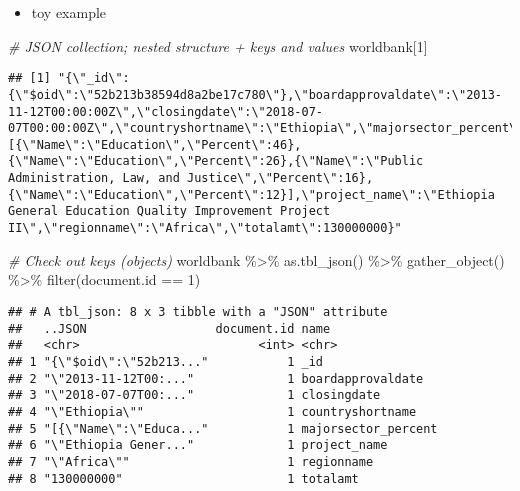 \documentclass[
]{book}
\newenvironment{Shaded}{\begin{snugshade}}{\end{snugshade}}
\newcommand{\CommentTok}[1]{\textcolor[rgb]{0.56,0.35,0.01}{\textit{#1}}}
\newcommand{\DecValTok}[1]{\textcolor[rgb]{0.00,0.00,0.81}{#1}}
\newcommand{\FunctionTok}[1]{\textcolor[rgb]{0.00,0.00,0.00}{#1}}
\newcommand{\NormalTok}[1]{#1}
\newcommand{\SpecialCharTok}[1]{\textcolor[rgb]{0.00,0.00,0.00}{#1}}
\providecommand{\tightlist}{%
  \setlength{\itemsep}{0pt}\setlength{\parskip}{0pt}}
\begin{document}
\begin{itemize}
\tightlist
\item
  toy example
\end{itemize}

\begin{Shaded}
\begin{Highlighting}[]
\CommentTok{\# JSON collection; nested structure + keys and values }
\NormalTok{worldbank[}\DecValTok{1}\NormalTok{]}
\end{Highlighting}
\end{Shaded}

\begin{verbatim}
## [1] "{\"_id\":{\"$oid\":\"52b213b38594d8a2be17c780\"},\"boardapprovaldate\":\"2013-11-12T00:00:00Z\",\"closingdate\":\"2018-07-07T00:00:00Z\",\"countryshortname\":\"Ethiopia\",\"majorsector_percent\":[{\"Name\":\"Education\",\"Percent\":46},{\"Name\":\"Education\",\"Percent\":26},{\"Name\":\"Public Administration, Law, and Justice\",\"Percent\":16},{\"Name\":\"Education\",\"Percent\":12}],\"project_name\":\"Ethiopia General Education Quality Improvement Project II\",\"regionname\":\"Africa\",\"totalamt\":130000000}"
\end{verbatim}

\begin{Shaded}
\begin{Highlighting}[]
\CommentTok{\# Check out keys (objects)}
\NormalTok{worldbank }\SpecialCharTok{\%\textgreater{}\%} 
  \FunctionTok{as.tbl\_json}\NormalTok{() }\SpecialCharTok{\%\textgreater{}\%}
  \FunctionTok{gather\_object}\NormalTok{() }\SpecialCharTok{\%\textgreater{}\%}
  \FunctionTok{filter}\NormalTok{(document.id }\SpecialCharTok{==} \DecValTok{1}\NormalTok{)}
\end{Highlighting}
\end{Shaded}

\begin{verbatim}
## # A tbl_json: 8 x 3 tibble with a "JSON" attribute
##   ..JSON                  document.id name               
##   <chr>                         <int> <chr>              
## 1 "{\"$oid\":\"52b213..."           1 _id                
## 2 "\"2013-11-12T00:..."             1 boardapprovaldate  
## 3 "\"2018-07-07T00:..."             1 closingdate        
## 4 "\"Ethiopia\""                    1 countryshortname   
## 5 "[{\"Name\":\"Educa..."           1 majorsector_percent
## 6 "\"Ethiopia Gener..."             1 project_name       
## 7 "\"Africa\""                      1 regionname         
## 8 "130000000"                       1 totalamt
\end{verbatim}
\end{document}
